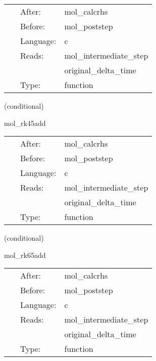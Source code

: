 \hspace{5mm}

 \begin{tabular*}{160mm}{cll} 
~ & After:  & mol\_calcrhs \\ 
~ & Before:  & mol\_poststep \\ 
~ & Language:  & c \\ 
~ & Reads:  & mol\_intermediate\_step \\ 
~& ~ &original\_delta\_time\\ 
~ & Type:  & function \\ 
\end{tabular*} 


\vspace{5mm}

   (conditional) 

\hspace{5mm} mol\_rk45add 

\hspace{5mm}{\it updates calculated with the runge-kutta 45 method } 


\hspace{5mm}

 \begin{tabular*}{160mm}{cll} 
~ & After:  & mol\_calcrhs \\ 
~ & Before:  & mol\_poststep \\ 
~ & Language:  & c \\ 
~ & Reads:  & mol\_intermediate\_step \\ 
~& ~ &original\_delta\_time\\ 
~ & Type:  & function \\ 
\end{tabular*} 


\vspace{5mm}

   (conditional) 

\hspace{5mm} mol\_rk65add 

\hspace{5mm}{\it updates calculated with the runge-kutta 65 method } 


\hspace{5mm}

 \begin{tabular*}{160mm}{cll} 
~ & After:  & mol\_calcrhs \\ 
~ & Before:  & mol\_poststep \\ 
~ & Language:  & c \\ 
~ & Reads:  & mol\_intermediate\_step \\ 
~& ~ &original\_delta\_time\\ 
~ & Type:  & function \\ 
\end{tabular*} 



